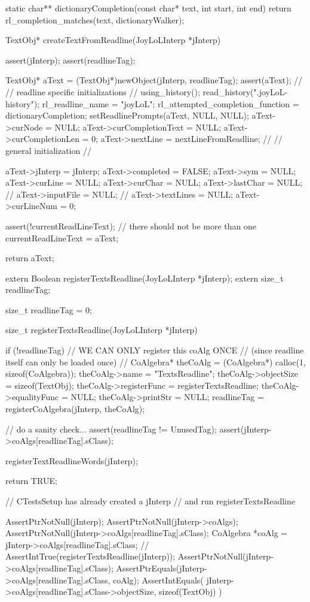static char** dictionaryCompletion(const char* text, int start, int end) {
 return rl_completion_matches(text, dictionaryWalker);
}
\stopCCode

\startCCode
TextObj* createTextFromReadline(JoyLoLInterp *jInterp) {
  assert(jInterp);
  assert(readlineTag);
  
  TextObj* aText = (TextObj*)newObject(jInterp, readlineTag);
  assert(aText);
  //
  // readline specific initializations
  //
  using_history();
  read_history(".joyLoL-history");
  rl_readline_name = "joyLoL";
  rl_attempted_completion_function = dictionaryCompletion;
  setReadlinePrompts(aText, NULL, NULL);
  aText->curNode = NULL;
  aText->curCompletionText = NULL;
  aText->curCompletionLen  = 0;
  aText->nextLine = nextLineFromReadline;
  //
  // general initialization
  //

  aText->jInterp    = jInterp;
  aText->completed  = FALSE;
  aText->sym        = NULL;
  aText->curLine    = NULL;
  aText->curChar    = NULL;
  aText->lastChar   = NULL;
  //
  aText->inputFile = NULL;
  //
  aText->textLines  = NULL;
  aText->curLineNum = 0;

  assert(!currentReadLineText); // there should not be more than one
  currentReadLineText = aText;

  return aText;
}
\stopCCode

\startTestSuite[registerTextsReadline]

\startCHeader
extern Boolean registerTextsReadline(JoyLoLInterp *jInterp);
extern size_t readlineTag;
\stopCHeader

\startCCode
size_t   readlineTag = 0;

size_t registerTextsReadline(JoyLoLInterp *jInterp) {
  if (!readlineTag) {
    // WE CAN ONLY register this coAlg ONCE
    // (since readline itself can only be loaded once)
    //
    CoAlgebra* theCoAlg    = (CoAlgebra*) calloc(1, sizeof(CoAlgebra));
    theCoAlg->name         = "TextsReadline";
    theCoAlg->objectSize   = sizeof(TextObj);
    theCoAlg->registerFunc = registerTextsReadline;
    theCoAlg->equalityFunc = NULL;
    theCoAlg->printStr     = NULL;
    readlineTag = registerCoAlgebra(jInterp, theCoAlg);
  }
  
  // do a sanity check...
  assert(readlineTag != UnusedTag);
  assert(jInterp->coAlgs[readlineTag].sClass);
  
  registerTextReadlineWords(jInterp);

  return TRUE;
}
\stopCCode


\startCTest
  // CTestsSetup has already created a jInterp
  // and run registerTextsReadline
  
  AssertPtrNotNull(jInterp);
  AssertPtrNotNull(jInterp->coAlgs);
  AssertPtrNotNull(jInterp->coAlgs[readlineTag].sClass);
  CoAlgebra *coAlg = jInterp->coAlgs[readlineTag].sClass;
//  AssertIntTrue(registerTextsReadline(jInterp));
  AssertPtrNotNull(jInterp->coAlgs[readlineTag].sClass);
  AssertPtrEquals(jInterp->coAlgs[readlineTag].sClass, coAlg);
  AssertIntEquals(
    jInterp->coAlgs[readlineTag].sClass->objectSize,
    sizeof(TextObj)
  )
\stopCTest
\stopTestCase
\stopTestSuite
